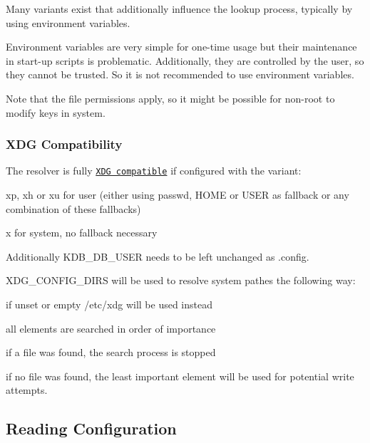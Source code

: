Many variants exist that additionally influence the lookup process, typically by using environment variables.

Environment variables are very simple for one-\/time usage but their maintenance in start-\/up scripts is problematic. Additionally, they are controlled by the user, so they cannot be trusted. So it is not recommended to use environment variables.

Note that the file permissions apply, so it might be possible for non-\/root to modify keys in system.

\subsubsection*{X\+D\+G Compatibility}

The resolver is fully \href{http://standards.freedesktop.org/basedir-spec/basedir-spec-latest.html}{\tt X\+D\+G compatible} if configured with the variant\+:


\begin{DoxyItemize}
\item xp, xh or xu for user (either using passwd, H\+O\+M\+E or U\+S\+E\+R as fallback or any combination of these fallbacks)
\item x for system, no fallback necessary
\end{DoxyItemize}

Additionally K\+D\+B\+\_\+\+D\+B\+\_\+\+U\+S\+E\+R needs to be left unchanged as {\ttfamily .config}.

X\+D\+G\+\_\+\+C\+O\+N\+F\+I\+G\+\_\+\+D\+I\+R\+S will be used to resolve system pathes the following way\+:


\begin{DoxyItemize}
\item if unset or empty /etc/xdg will be used instead
\item all elements are searched in order of importance
\begin{DoxyItemize}
\item if a file was found, the search process is stopped
\item if no file was found, the least important element will be used for potential write attempts.
\end{DoxyItemize}
\end{DoxyItemize}

\subsection*{Reading Configuration}

